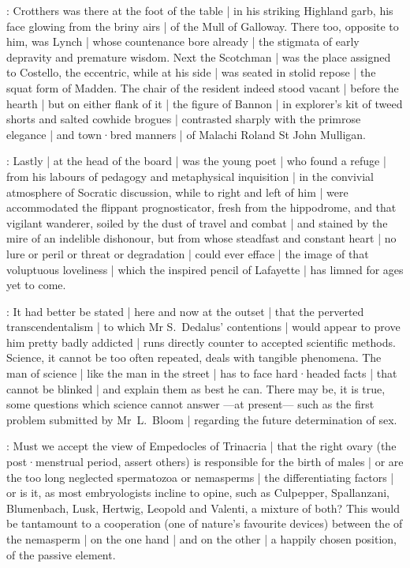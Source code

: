 :
Crotthers was there at the foot of the table |
in his striking Highland garb,
his face glowing from the briny airs |
of the Mull of Galloway.
There too,
opposite to him,
was Lynch |
whose countenance bore already |
the stigmata of early depravity and premature wisdom.
Next the Scotchman |
was the place assigned to Costello,
the eccentric,
while at his side |
was seated in stolid repose |
the squat form of Madden.
The chair of the resident indeed stood vacant |
before the hearth |
but on either flank of it |
the figure of Bannon |
in explorer's kit of tweed shorts and salted cowhide brogues |
contrasted sharply with the primrose elegance |
and town·bred manners |
of Malachi Roland St John Mulligan.

:
Lastly |
at the head of the board |
was the young poet |
who found a refuge |
from his labours of pedagogy and metaphysical inquisition |
in the convivial atmosphere of Socratic discussion,
while to right and left of him |
were accommodated the flippant prognosticator,
fresh from the hippodrome,
and that vigilant wanderer,
soiled by the dust of travel and combat |
and stained by the mire of an indelible dishonour,
but from whose steadfast and constant heart |
no lure or peril or threat or degradation |
could ever efface |
the image of that voluptuous loveliness |
which the inspired pencil of Lafayette |
has limned for ages yet to come.



:
It had better be stated |
here and now at the outset |
that the perverted transcendentalism |
to which Mr S.~Dedalus' contentions |
would appear to prove him pretty badly addicted |
runs directly counter to accepted scientific methods.
Science,
it cannot be too often repeated,
deals with tangible phenomena.
The man of science |
like the man in the street |
has to face hard·headed facts |
that cannot be blinked |
and explain them as best he can.
There may be,
it is true,
some questions which science cannot answer%
---at present---%
such as the first problem submitted by Mr~L.~Bloom |
regarding the future determination of sex.

:
Must we accept the view of Empedocles of Trinacria |
that the right ovary
(the post·menstrual period,
assert others)
is responsible for the birth of males |
or are the too long neglected spermatozoa or nemasperms |
the differentiating factors |
or is it,
as most embryologists incline to opine,
such as Culpepper,
Spallanzani,
Blumenbach,
Lusk,
Hertwig,
Leopold and
Valenti,
a mixture of both?
This would be tantamount to a cooperation
(one of nature's favourite devices)
between the  of the nemasperm |
on the one hand |
and on the other |
a happily chosen position,
 of the passive element.

